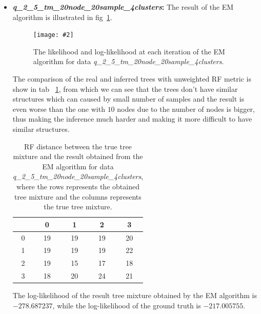 \documentclass[11pt]{extarticle}
\newcommand{\0}{\mathbf{0}}
\renewcommand{\(}{\left(}
\renewcommand{\)}{\right)}
\theoremstyle{definition}
\newcommand{\image}[3]{
	\begin{figure}[!ht]
		\centering
	    \texttt{[image: \#2]}
		\caption{#3}
		\label{fig:#2}
	\end{figure}
}
\begin{document}
\begin{itemize}
	\item \textbf{\textit{q\_2\_5\_tm\_20node\_20sample\_4clusters}:} The result of the EM algorithm is illustrated in fig~\ref{fig:D20_N20_K4}.
	\image{0.9}{D20_N20_K4}{The likelihood and log-likelihood at each iteration of the EM algorithm for data \textit{q\_2\_5\_tm\_20node\_20sample\_4clusters}.}
	\par The comparison of the real and inferred trees with unweighted RF metric is show in tab~ \ref{tab:RF_D20_N20_K4}, from which we can see that the trees don't have similar structures which can caused by small number of samples and the result is even worse than the one with $10$ nodes due to the number of nodes is bigger, thus making the inference much harder and making it more difficult to have similar structures.
	\begin{table}[!ht]
		\centering
		\caption{RF distance between the true tree mixture and the result obtained from the EM algorithm for data \textit{q\_2\_5\_tm\_20node\_20sample\_4clusters}, where the rows represents the obtained tree mixture and the columns represents the true tree mixture.}
		\begin{tabular}{c|cccc}
			 & 0 & 1 & 2 & 3 \\
			 \hline
			 0 & 19 & 19 & 19 & 20 \\
			 1 & 19 & 19 & 19 & 22 \\
			 2 & 19 & 15 & 17 & 18 \\
			 3 & 18 & 20 & 24 & 21
		\end{tabular}
		\label{tab:RF_D20_N20_K4}
	\end{table}
	\par The log-likelihood of the result tree mixture obtained by the EM algorithm is $-278.687237$, while the log-likelihood of the ground truth is $-217.005755$.
\end{itemize}
\end{document}
